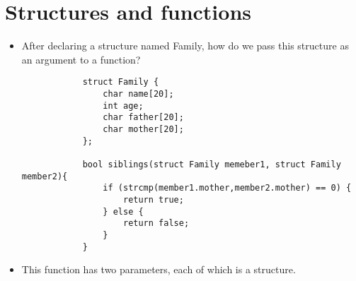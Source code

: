 \section{Structures and functions}
\begin{itemize}
    \item After declaring a structure named Family, how do we pass this structure as an argument to a function? 
        \begin{verbatim}
            struct Family {
                char name[20]; 
                int age;
                char father[20]; 
                char mother[20];
            };

            bool siblings(struct Family memeber1, struct Family member2){
                if (strcmp(member1.mother,member2.mother) == 0) {
                    return true;
                } else {
                    return false;
                }
            }
        \end{verbatim}
    \item This function has two parameters, each of which is a structure. 
\end{itemize}

